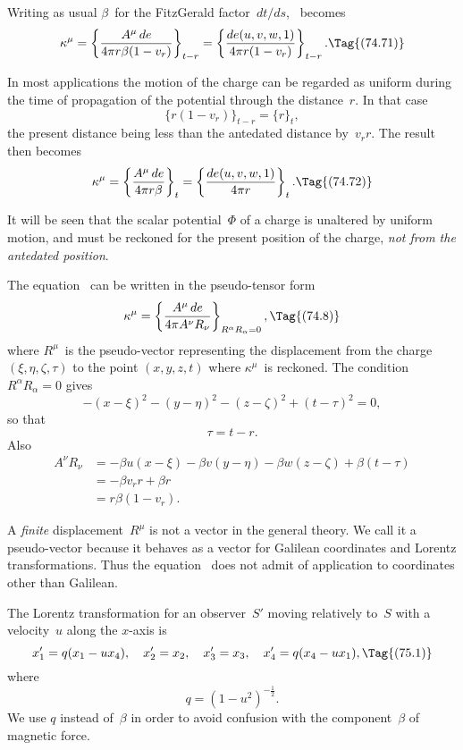 \documentclass[12pt]{book}
\begin{document}
Writing as usual $\beta$~for the FitzGerald factor~$dt/ds$, ~becomes
\[
\kappa^{\mu} = \left\{\frac{A^{\mu}\, de}{4\pi r\beta(1 - v_{r})}\right\}_{t-r}
= \left\{\frac{de(u, v, w, 1)}{4\pi r(1 - v_{r})}\right\}_{t-r}.
\Tag{(74.71)}
\]

In most applications the motion of the charge can be regarded as uniform
during the time of propagation of the potential through the distance~$r$. In
that case
\[
\{r(1 - v_{r})\}_{t-r} = \{r\}_{t},
\]
the present distance being less than the antedated distance by~$v_{r} r$. The result
then becomes
\[
\kappa^{\mu} = \left\{\frac{A^{\mu}\, de}{4\pi r\beta}\right\}_{t}
= \left\{\frac{de(u, v, w, 1)}{4\pi r}\right\}_{t}.
\Tag{(74.72)}
\]

It will be seen that the scalar potential~$\Phi$ of a charge is unaltered by
uniform motion, and must be reckoned for the present position of the charge,
\emph{not from the antedated position}.

The equation~ can be written in the pseudo-tensor form
\[
\kappa^{\mu} = \left\{\frac{A^{\mu}\, de}{4\pi A^{\nu}R_{\nu}}\right\}_{R^{\alpha}R_{\alpha}=0},
\Tag{(74.8)}
\]
where $R^{\mu}$~is the pseudo-vector representing the displacement from the charge
%
$(\xi, \eta, \zeta, \tau)$ to the point $(x, y, z, t)$ where $\kappa^{\mu}$~is reckoned. The condition
$R^{\alpha}R_{\alpha} = 0$ gives
\[
-(x - \xi)^{2} - (y - \eta)^{2} - (z - \zeta)^{2} + (t - \tau)^{2} = 0,
\]
so that
\[
\tau = t - r.
\]
Also
\begin{align*}
  A^{\nu} R_{\nu}
  &= -\beta u(x - \xi) - \beta v(y - \eta) - \beta w(z - \zeta) + \beta(t - \tau) \\
  &= -\beta v_{r} r + \beta r \\
  &= r\beta(1 - v_{r}).
\end{align*}

A \emph{finite} displacement~$R^{\mu}$ is not a vector in the general theory. We call it
a pseudo-vector because it behaves as a vector for Galilean coordinates and
Lorentz transformations. Thus the equation~ does not admit of application
to coordinates other than Galilean.

%
%

The Lorentz transformation for an observer~$S'$ moving relatively to~$S$ with
a velocity~$u$ along the $x$-axis is
\[
x_{1}' = q(x_{1} - u x_{4}),\quad
x_{2}' = x_{2},\quad
x_{3}' = x_{3},\quad
x_{4}' = q(x_{4} - u x_{1}),
\Tag{(75.1)}
\]
where
\[
q = (1 - u^{2})^{-\frac{1}{2}}.
\]
We use $q$ instead of~$\beta$ in order to avoid confusion with the component~$\beta$ of
magnetic force.
%
%
\end{document}

